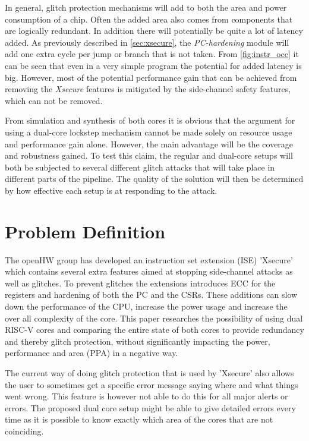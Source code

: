 In general, glitch protection mechanisms will add to both the area and power consumption of a chip. Often the added area also comes from components that are logically redundant. In addition there will potentially be quite a lot of latency added. As previously described in \autoref{sec:xsecure}, the \textit{PC-hardening} module will add one extra cycle per jump or branch that is not taken. From \autoref{fig:instr_occ} it can be seen that even in a very simple program the potential for added latency is big. However, most of the potential performance gain that can be achieved from removing the \textit{Xsecure} features is mitigated by the side-channel safety features, which can not be removed. 

From simulation and synthesis of both cores it is obvious that the argument for using a dual-core lockstep mechanism cannot be made solely on resource usage and performance gain alone. However, the main advantage will be the coverage and robustness gained. To test this claim, the regular and dual-core setups will both be subjected to several different glitch attacks that will take place in different parts of the pipeline. The quality of the solution will then be determined by how effective each setup is at responding to the attack. 

\section{Problem Definition}

The openHW group has developed an instruction set extension (ISE) 'Xsecure' which contains several extra features aimed at stopping side-channel attacks as well as glitches. To prevent glitches the extensions introduces ECC for the registers and hardening of both the PC and the CSRs. These additions can slow down the performance of the CPU, increase the power usage and increase the over all complexity of the core. This paper researches the possibility of using dual RISC-V cores and comparing the entire state of both cores to provide redundancy and thereby glitch protection, without significantly impacting the power, performance and area (PPA) in a negative way. 

The current way of doing glitch protection that is used by 'Xsecure' also allows the user to sometimes get a specific error message saying where and what things went wrong. This feature is however not able to do this for all major alerts or errors. The proposed dual core setup might be able to give detailed errors every time as it is possible to know exactly which area of the cores that are not coinciding. 

